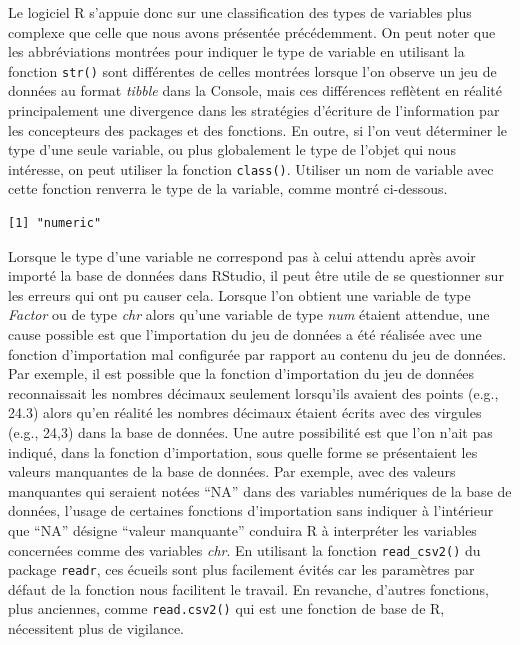 \documentclass[
  letterpaper,
]{book}
\newenvironment{Shaded}{\begin{snugshade}}{\end{snugshade}}
\newcommand{\AttributeTok}[1]{\textcolor[rgb]{0.40,0.45,0.13}{#1}}
\newcommand{\FunctionTok}[1]{\textcolor[rgb]{0.28,0.35,0.67}{#1}}
\newcommand{\NormalTok}[1]{\textcolor[rgb]{0.00,0.23,0.31}{#1}}
\newcommand{\SpecialCharTok}[1]{\textcolor[rgb]{0.37,0.37,0.37}{#1}}
\begin{document}
Le logiciel R s'appuie donc sur une classification des types de
variables plus complexe que celle que nous avons présentée précédemment.
On peut noter que les abbréviations montrées pour indiquer le type de
variable en utilisant la fonction \texttt{str()} sont différentes de
celles montrées lorsque l'on observe un jeu de données au format
\emph{tibble} dans la Console, mais ces différences reflètent en réalité
principalement une divergence dans les stratégies d'écriture de
l'information par les concepteurs des packages et des fonctions. En
outre, si l'on veut déterminer le type d'une seule variable, ou plus
globalement le type de l'objet qui nous intéresse, on peut utiliser la
fonction \texttt{class()}. Utiliser un nom de variable avec cette
fonction renverra le type de la variable, comme montré ci-dessous.

\begin{Shaded}
\end{Shaded}

\begin{verbatim}
[1] "numeric"
\end{verbatim}

Lorsque le type d'une variable ne correspond pas à celui attendu après
avoir importé la base de données dans RStudio, il peut être utile de se
questionner sur les erreurs qui ont pu causer cela. Lorsque l'on obtient
une variable de type \emph{Factor} ou de type \emph{chr} alors qu'une
variable de type \emph{num} étaient attendue, une cause possible est que
l'importation du jeu de données a été réalisée avec une fonction
d'importation mal configurée par rapport au contenu du jeu de données.
Par exemple, il est possible que la fonction d'importation du jeu de
données reconnaissait les nombres décimaux seulement lorsqu'ils avaient
des points (e.g., 24.3) alors qu'en réalité les nombres décimaux étaient
écrits avec des virgules (e.g., 24,3) dans la base de données. Une autre
possibilité est que l'on n'ait pas indiqué, dans la fonction
d'importation, sous quelle forme se présentaient les valeurs manquantes
de la base de données. Par exemple, avec des valeurs manquantes qui
seraient notées ``NA'' dans des variables numériques de la base de
données, l'usage de certaines fonctions d'importation sans indiquer à
l'intérieur que ``NA'' désigne ``valeur manquante'' conduira R à
interpréter les variables concernées comme des variables \emph{chr}. En
utilisant la fonction \texttt{read\_csv2()} du package \texttt{readr},
ces écueils sont plus facilement évités car les paramètres par défaut de
la fonction nous facilitent le travail. En revanche, d'autres fonctions,
plus anciennes, comme \texttt{read.csv2()} qui est une fonction de base
de R, nécessitent plus de vigilance.
\end{document}
